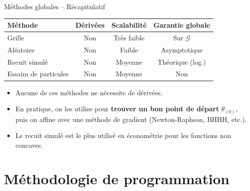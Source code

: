 \documentclass[11pt,aspectratio=169]{beamer}
\begin{document}
\begin{frame}{Méthodes globales -- Récapitulatif}

\begin{center}
    \small
    \renewcommand{\arraystretch}{1.3}
    \begin{tabular}{lccc}
        \toprule
        \textbf{Méthode} & \textbf{Dérivées} & \textbf{Scalabilité} & \textbf{Garantie globale} \\
        \midrule
        Grille & Non & Très faible & Sur $\mathcal{G}$ \\
        Aléatoire & Non & Faible & Asymptotique \\
        Recuit simulé & Non & Moyenne & Théorique (log.) \\
        Essaim de particules & Non & Moyenne & Non \\
        \bottomrule
    \end{tabular}
\end{center}

\vspace{0.3cm}

\begin{itemize}

\item Aucune de ces méthodes ne nécessite de dérivées.\newline

\item En pratique, on les utilise pour \textbf{trouver un bon point de départ} $\theta_{(0)}$, puis on affine avec une méthode de gradient (Newton-Raphson, BHHH, etc.).\newline

\item Le recuit simulé est le plus utilisé en économétrie pour les fonctions non concaves.

\end{itemize}

\end{frame}

\section{Méthodologie de programmation}
\end{document}
